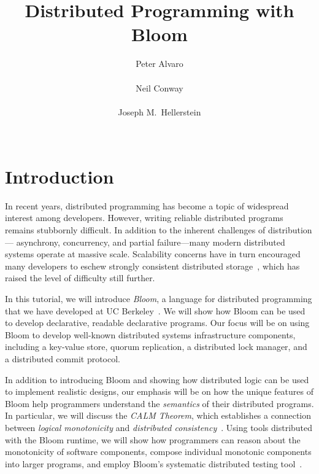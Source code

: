 \documentclass{sig-alternate}
\begin{document}
\title{Distributed Programming with Bloom}

\author{
\alignauthor
Peter Alvaro\\
        \\
\alignauthor
Neil Conway\\
        \\
\alignauthor
Joseph M.\ Hellerstein\\
        \\
}

\maketitle

\section{Introduction}

In recent years, distributed programming has become a topic of widespread
interest among developers. However, writing reliable distributed programs
remains stubbornly difficult. In addition to the inherent challenges of
distribution--- asynchrony, concurrency, and partial failure---many modern
distributed systems operate at massive scale. Scalability concerns have in turn
encouraged many developers to eschew strongly consistent distributed
storage~\cite{Birman2009,Helland2009}, which has raised the level of difficulty
still further.

In this tutorial, we will introduce \emph{Bloom}, a language for distributed
programming that we have developed at UC Berkeley~\cite{bloom-website}. We will
show how Bloom can be used to develop declarative, readable declarative
programs. Our focus will be on using Bloom to develop well-known distributed
systems infrastructure components, including a key-value store, quorum
replication, a distributed lock manager, and a distributed commit protocol.

In addition to introducing Bloom and showing how distributed logic can be used
to implement realistic designs, our emphasis will be on how the unique features
of Bloom help programmers understand the \emph{semantics} of their distributed
programs. In particular, we will discuss the \emph{CALM Theorem}, which
establishes a connection between \emph{logical monotonicity} and
\emph{distributed
  consistency}~\cite{Alvaro2011,Ameloot2011,Hellerstein2010,dedalus-confluence}. Using
tools distributed with the Bloom runtime, we will show how programmers can
reason about the monotonicity of software components, compose individual
monotonic components into larger programs, and employ Bloom's systematic
distributed testing tool~\cite{Alvaro2012}.
\end{document}
